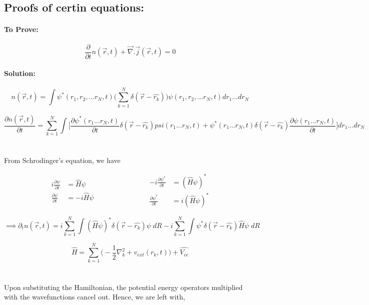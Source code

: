 \documentclass[12pt]{article}
\begin{document}
\newpage

\subsection{Proofs of certin equations:}

\paragraph{To Prove:}
\[ \frac{\partial}{\partial t}n(\vec{r},t) + \vec{\nabla}.  \vec{j}(\vec{r},t) = 0\]

\paragraph{Solution:}
\[ n(\vec{r},t) = \int \psi^*(r_1,r_2,...r_N,t) \big( \sum_{k=1}^{N} \delta(\vec{r} - \hat{r_k})\big) 
\psi(r_1,r_2,...r_N,t) dr_1...dr_N\]

\[ \frac{\partial n(\vec{r},t)}{\partial t} = \sum_{k=1}^{N} \int \Big[ \frac{\partial \psi^* 
(r_1...r_N,t)}{\partial t} \delta(\vec{r} - \hat{r_k}) psi(r_1...r_N,t) + \psi^* (r_1...r_N,t) \delta(\vec{r} - \hat{r_k}) 
\frac{\partial \psi (r_1...r_N,t)}{\partial t} \Big] dr_1...dr_N \]
\\
\\
From Schrodinger's equation, we have 

\[
\begin{aligned}
    i \frac{\partial \psi}{\partial t} &= \hat{H} \psi \\
    \frac{\partial \psi}{\partial t} &= -i \hat{H} \psi
\end{aligned}
\hspace{3cm}
\begin{aligned}
    -i \frac{\partial \psi^*}{\partial t} &= (\hat{H} \psi)^* \\
    \frac{\partial \psi^*}{\partial t} &= i (\hat{H} \psi)^*
\end{aligned}
\]

\[ \implies \partial_t n(\vec{r},t) = i \sum_{k=1}^{N} \int (\hat{H} \psi)^* \delta(\vec{r} - \hat{r_k}) 
\psi \; dR - i \sum_{k=1}^{N} \int \psi^* \delta(\vec{r} - \hat{r_k}) \hat{H}\psi \;dR\]

\[ \hat{H} = \sum_{k=1}^{N} \big(-\frac{1}{2} \nabla^2_k + v_{ext}(r_k,t) \big) + \hat{V_{ee}}\]
\\
\\
Upon substituting the Hamiltonian, the potential energy operators multiplied with the wavefunctions cancel out. Hence, we are left with,
\end{document}
